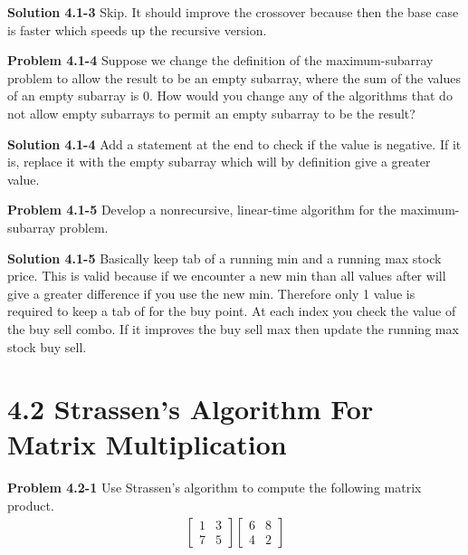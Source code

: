 \documentclass{article}
\begin{document}
\medskip

\textbf{Solution 4.1-3} Skip. It should improve the crossover because then the base case is faster which speeds up the recursive version.

\hrulefill

\medskip

\textbf{Problem 4.1-4} Suppose we change the definition of the maximum-subarray problem to allow the result to be an empty subarray, where the sum of the values of an empty subarray is 0. How would you change any of the algorithms that do not allow empty subarrays to permit an empty subarray to be the result?

\medskip

\textbf{Solution 4.1-4} Add a statement at the end to check if the value is negative. If it is, replace it with the empty subarray which will by definition give a greater value.

\hrulefill

\medskip

\textbf{Problem 4.1-5} Develop a nonrecursive, linear-time algorithm for the maximum-subarray problem.

\medskip

\textbf{Solution 4.1-5} Basically keep tab of a running min and a running max stock price. This is valid because if we encounter a new min than all values after will give a greater difference if you use the new min. Therefore only 1 value is required to keep a tab of for the buy point. At each index you check the value of the buy sell combo. If it improves the buy sell max then update the running max stock buy sell.

\hrulefill

\section*{4.2 Strassen's Algorithm For Matrix Multiplication}

\hrulefill

\medskip

\textbf{Problem 4.2-1} Use Strassen's algorithm to compute the following matrix product.
\begin{align*}
\begin{bmatrix}
    1 &	3 \\
    7 &	5
\end{bmatrix}
\begin{bmatrix}
    6 &	8 \\
    4 &	2
\end{bmatrix}
\end{align*}
\end{document}
